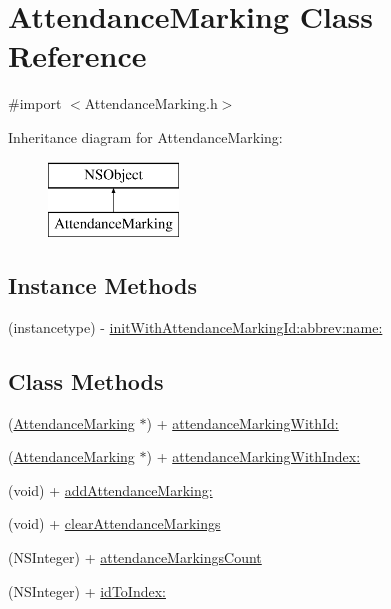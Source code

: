 \hypertarget{interface_attendance_marking}{\section{Attendance\+Marking Class Reference}
\label{interface_attendance_marking}
}


{\ttfamily \#import $<$Attendance\+Marking.\+h$>$}

Inheritance diagram for Attendance\+Marking\+:\begin{figure}[H]
\begin{center}
\leavevmode
\includegraphics[height=2.000000cm]{interface_attendance_marking}
\end{center}
\end{figure}
\subsection*{Instance Methods}
\begin{DoxyCompactItemize}
\item 
(instancetype) -\/ \hyperlink{interface_attendance_marking_a6f38236cf3c6b23f42ebe44036cf8496}{init\+With\+Attendance\+Marking\+Id\+:abbrev\+:name\+:}
\end{DoxyCompactItemize}
\subsection*{Class Methods}
\begin{DoxyCompactItemize}
\item 
(\hyperlink{interface_attendance_marking}{Attendance\+Marking} $\ast$) + \hyperlink{interface_attendance_marking_a8433859ec71fc8803abc240a003f3810}{attendance\+Marking\+With\+Id\+:}
\item 
(\hyperlink{interface_attendance_marking}{Attendance\+Marking} $\ast$) + \hyperlink{interface_attendance_marking_a864de84c57b2c40cab4c11f81b593049}{attendance\+Marking\+With\+Index\+:}
\item 
(void) + \hyperlink{interface_attendance_marking_a8b7521298b1e5f2da13a553c07b96641}{add\+Attendance\+Marking\+:}
\item 
(void) + \hyperlink{interface_attendance_marking_aac7841ec88daef3846aef57eb3aef678}{clear\+Attendance\+Markings}
\item 
(N\+S\+Integer) + \hyperlink{interface_attendance_marking_a18d628d46cf571cb46ac74e514903d88}{attendance\+Markings\+Count}
\item 
(N\+S\+Integer) + \hyperlink{interface_attendance_marking_a47c3e10b3de328a9acac4b61394e4751}{id\+To\+Index\+:}
\end{DoxyCompactItemize}
